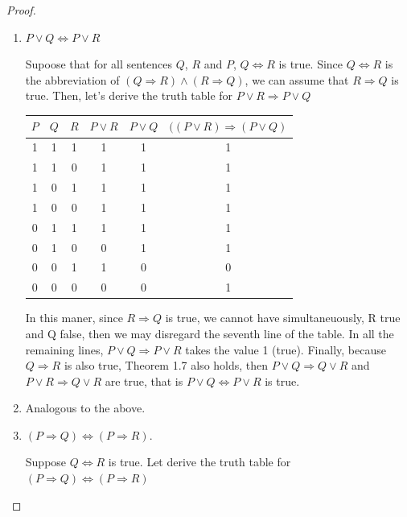 \documentclass{article}
\begin{document}
\begin{enumerate}
\begin{proof}
			\begin{enumerate}
				\item[a)] $P \lor Q \iff P \lor R$
				
				Supoose that for all sentences $Q$, $R$ and $P$, $Q \iff R$ is true. Since $Q \iff R$ is the abbreviation of $(Q \Rightarrow R) \land (R \Rightarrow Q)$, we can assume that $R \Rightarrow Q$ is true. Then, let's derive the truth table for $P \lor R \Rightarrow P \lor Q$
				
					\begin{center}
					\begin{tabular}{|c|c|c|c|c|c|}
						\hline
						$P$ & $Q$ & $R$ & $P \lor R$ & $P \lor Q$ & $((P \lor R) \Rightarrow (P \lor Q)$\\
						\hline
						1 & 1 & 1 & 1 & 1 & 1\\
						1 & 1 & 0 & 1 & 1 & 1\\
						1 & 0 & 1 & 1 & 1 & 1\\
						1 & 0 & 0 & 1 & 1 & 1\\
						0 & 1 & 1 & 1 & 1 & 1\\
						0 & 1 & 0 & 0 & 1 & 1\\
						0 & 0 & 1 & 1 & 0 & 0\\
						0 & 0 & 0 & 0 & 0 & 1\\
						\hline
					\end{tabular}
				\end{center}
				
				In this maner, since $R \Rightarrow Q$ is true, we cannot have simultaneuously, R true and Q false, then we may disregard the seventh line of the table. In all the remaining lines, $P \lor Q \Rightarrow P \lor R$ takes the value 1 (true). Finally, because $Q \Rightarrow R$ is also true, Theorem 1.7 also holds, then $P \lor Q \Rightarrow Q \lor R$ and $P \lor R \Rightarrow Q \lor R$ are true, that is $P \lor Q \iff P \lor R$ is true.
				
				\item[b)] Analogous to the above. 
				\item[c)] $(P \Rightarrow Q) \iff (P \Rightarrow R)$.
				
				Suppose $Q \iff R$ is true. Let derive the truth table for $(P \Rightarrow Q) \iff  (P \Rightarrow R)$
				

\end{enumerate}
\end{proof}
\end{enumerate}
\end{document}
